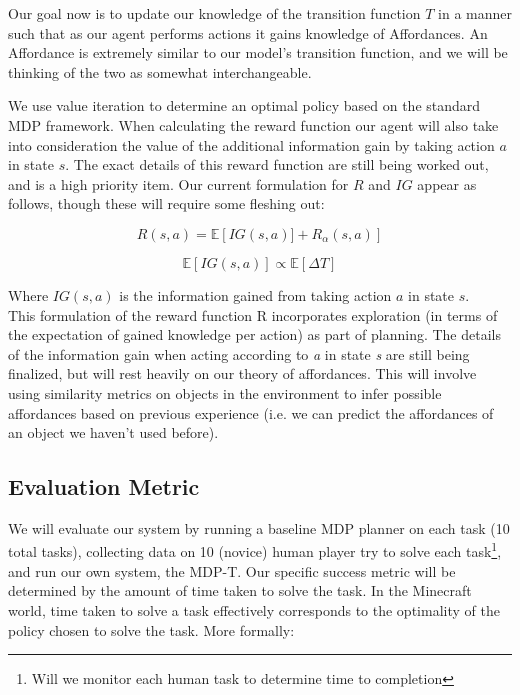\documentclass[a4paper]{article}
\begin{document}
Our goal now is to update our knowledge of the transition function $T$ in a manner such that as our agent performs actions it gains knowledge of Affordances. An Affordance is extremely similar to our model's transition function, and we will be thinking of the two as somewhat interchangeable.

We use value iteration to determine an optimal policy based on the standard MDP framework. When calculating the reward function our agent will also take into consideration the value of the additional information gain by taking action $a$ in state $s$. The exact details of this reward function are still being worked out, and is a high priority item. Our current formulation for $R$ and $IG$ appear as follows, though these will require some fleshing out:

\[
R(s,a) = \mathbb{E}\left[IG(s,a)] + R_{\alpha}(s,a)\right]
\]

\[
\mathbb{E}\left[IG(s,a)\right] \propto \mathbb{E}\left[\Delta T\right]
\]

Where $IG(s,a)$ is the information gained from taking action $a$ in state $s$. \\

This formulation of the reward function R incorporates exploration (in terms of the expectation of gained knowledge per action) as part of planning. The details of the information gain when acting according to {\it a} in state {\it s} are still being finalized, but will rest heavily on our theory of affordances. This will involve using similarity metrics on objects in the environment to infer possible affordances based on previous experience (i.e. we can predict the affordances of an object we haven't used before).



\subsection{Evaluation Metric}
We will evaluate our system by running a baseline MDP planner on each task (10 total tasks), collecting data on 10 (novice) human player try to solve each task\footnote{Will we monitor each human task to determine time to completion}, and run our own system, the MDP-T. Our specific success metric will be determined by the amount of time taken to solve the task. In the Minecraft world, time taken to solve a task effectively corresponds to the optimality of the policy chosen to solve the task. More formally:
\end{document}
